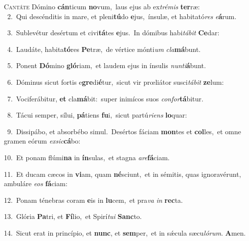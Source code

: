 \lettrine{\initial\textcolor{\initialcolor}{C}}{antáte} Dómino \textbf{cán}\-ticum \textbf{no}\-vum,~\star laus ejus ab ex\-\textit{tré}\-\textit{mis} \textbf{ter}\-ræ:\\
{\numbfont\textcolor{\numbcolor}{~2.}}~Qui descénditis in mare, et pleni\-\textbf{tú}\-do \textbf{e}\-jus,~\star ínsulæ, et habitató\textit{res} \textit{e}\-\textbf{á}rum.\par
{\numbfont\textcolor{\numbcolor}{~3.}}~Sublevétur desértum et civi\-\textbf{tá}\-tes \textbf{e}\-jus.~\star In dómibus habi\-\textit{tá}\-\textit{bit} \textbf{Ce}\-dar:\par
{\numbfont\textcolor{\numbcolor}{~4.}}~Laudáte, habita\-\textbf{tó}\-res \textbf{Pe}\-træ,~\star de vértice mónti\textit{um} \textit{cla}\-\textbf{má}bunt.\par
{\numbfont\textcolor{\numbcolor}{~5.}}~Ponent \textbf{Dó}\-mino \textbf{gló}\-riam,~\star et laudem ejus in ínsulis \textit{nun}\-\textit{ti}\textbf{á}bunt.\par
{\numbfont\textcolor{\numbcolor}{~6.}}~Dóminus sicut fortis e\-\textbf{gre}\-di\-\textbf{é}\-tur,~\star sicut vir prœliátor susci\-\textit{tá}\-\textit{bit} \textbf{ze}\-lum:\par
{\numbfont\textcolor{\numbcolor}{~7.}}~Vociferábitur, \textbf{et} cla\-\textbf{má}\-bit:~\star super inimícos suos \textit{con}\-\textit{for}\textbf{tá}bitur.\par
{\numbfont\textcolor{\numbcolor}{~8.}}~Tácui semper, sílui, \textbf{pá}\-tiens \textbf{fu}\-i,~\star sicut partú\-\textit{ri}\-\textit{ens} \textbf{lo}\-quar:\par
{\numbfont\textcolor{\numbcolor}{~9.}}~Dissipábo, et absorbébo simul.~\dagger Desértos fáciam \textbf{mon}\-tes et \textbf{col}\-les,~\star et omne gramen eórum \textit{ex}\-\textit{sic}\textbf{cá}bo:\par
{\numbfont\textcolor{\numbcolor}{10.}}~Et ponam flúmi\textbf{na} in \textbf{ín}\-sulas,~\star et stagna \textit{a}\-\textit{re}\textbf{fá}ciam.\par
{\numbfont\textcolor{\numbcolor}{11.}}~Et ducam cæcos in \textbf{vi}\-am, quam \textbf{né}\-sciunt,~\star et in sémitis, quas ignoravérunt, ambuláre \textit{e}\-\textit{os} \textbf{fá}\-ciam:\par
{\numbfont\textcolor{\numbcolor}{12.}}~Ponam ténebras coram \textbf{e}\-is in \textbf{lu}\-cem,~\star et pra\textit{va} \textit{in} \textbf{rec}\-ta.\par
{\numbfont\textcolor{\numbcolor}{13.}}~Glória \textbf{Pa}\-tri, et \textbf{Fí}\-lio,~\star et Spirí\-\textit{tu}\-\textit{i} \textbf{Sanc}\-to.\par
{\numbfont\textcolor{\numbcolor}{14.}}~Sicut erat in princípio, et \textbf{nunc}\-, et \textbf{sem}\-per,~\star et in sǽcula sæcu\-\textit{ló}\-\textit{rum}. \textbf{A}\-men.\par
